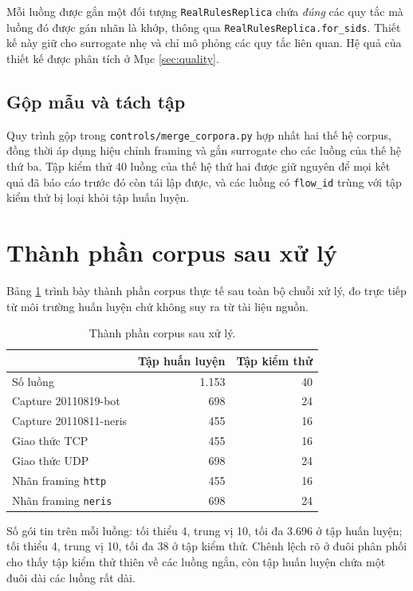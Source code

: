 \documentclass[12pt, a4paper, openany]{book}
\begin{document}
Mỗi luồng được gắn một đối tượng \texttt{RealRulesReplica} chứa \emph{đúng} các quy tắc mà luồng đó được gán nhãn là khớp, thông qua \texttt{RealRulesReplica.for\_sids}. Thiết kế này giữ cho surrogate nhẹ và chỉ mô phỏng các quy tắc liên quan. Hệ quả của thiết kế được phân tích ở Mục \ref{sec:quality}.

\subsection{Gộp mẫu và tách tập}

Quy trình gộp trong \texttt{controls/merge\_corpora.py} hợp nhất hai thế hệ corpus, đồng thời áp dụng hiệu chỉnh framing và gắn surrogate cho các luồng của thế hệ thứ ba. Tập kiểm thử 40 luồng của thế hệ thứ hai được giữ nguyên để mọi kết quả đã báo cáo trước đó còn tái lập được, và các luồng có \texttt{flow\_id} trùng với tập kiểm thử bị loại khỏi tập huấn luyện.

\section{Thành phần corpus sau xử lý}

Bảng \ref{tab:corpus} trình bày thành phần corpus thực tế sau toàn bộ chuỗi xử lý, đo trực tiếp từ môi trường huấn luyện chứ không suy ra từ tài liệu nguồn.

\begin{table}[htbp]
\centering
\caption{Thành phần corpus sau xử lý.}
\label{tab:corpus}
\begin{tabular}{lrr}
\toprule
 & Tập huấn luyện & Tập kiểm thử \\
\midrule
Số luồng & 1.153 & 40 \\
\midrule
Capture 20110819-bot & 698 & 24 \\
Capture 20110811-neris & 455 & 16 \\
\midrule
Giao thức TCP & 455 & 16 \\
Giao thức UDP & 698 & 24 \\
\midrule
Nhãn framing \texttt{http} & 455 & 16 \\
Nhãn framing \texttt{neris} & 698 & 24 \\
\bottomrule
\end{tabular}
\end{table}

Số gói tin trên mỗi luồng: tối thiểu 4, trung vị 10, tối đa 3.696 ở tập huấn luyện; tối thiểu 4, trung vị 10, tối đa 38 ở tập kiểm thử. Chênh lệch rõ ở đuôi phân phối cho thấy tập kiểm thử thiên về các luồng ngắn, còn tập huấn luyện chứa một đuôi dài các luồng rất dài.
\end{document}

